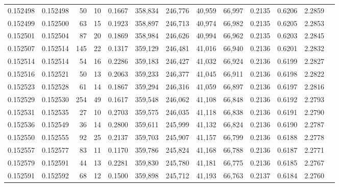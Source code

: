 \begin{tabular}{rrrrrrrrrrrrr}
0.152498 & 0.152498 &    50 &  10 &                                     0.1667 & 358,834 & 246,776 &  40,959 &  66,997 & 0.2135 & 0.6206 & 2.2859 \\
0.152499 & 0.152500 &    63 &  15 &                                     0.1923 & 358,897 & 246,713 &  40,974 &  66,982 & 0.2135 & 0.6205 & 2.2853 \\
0.152501 & 0.152504 &    87 &  20 &                                     0.1869 & 358,984 & 246,626 &  40,994 &  66,962 & 0.2135 & 0.6203 & 2.2845 \\
0.152507 & 0.152514 &   145 &  22 &                                     0.1317 & 359,129 & 246,481 &  41,016 &  66,940 & 0.2136 & 0.6201 & 2.2832 \\
0.152514 & 0.152514 &    54 &  16 &                                     0.2286 & 359,183 & 246,427 &  41,032 &  66,924 & 0.2136 & 0.6199 & 2.2827 \\
0.152516 & 0.152521 &    50 &  13 &                                     0.2063 & 359,233 & 246,377 &  41,045 &  66,911 & 0.2136 & 0.6198 & 2.2822 \\
0.152523 & 0.152528 &    61 &  14 &                                     0.1867 & 359,294 & 246,316 &  41,059 &  66,897 & 0.2136 & 0.6197 & 2.2816 \\
0.152529 & 0.152530 &   254 &  49 &                                     0.1617 & 359,548 & 246,062 &  41,108 &  66,848 & 0.2136 & 0.6192 & 2.2793 \\
0.152531 & 0.152535 &    27 &  10 &                                     0.2703 & 359,575 & 246,035 &  41,118 &  66,838 & 0.2136 & 0.6191 & 2.2790 \\
0.152536 & 0.152549 &    36 &  14 &                                     0.2800 & 359,611 & 245,999 &  41,132 &  66,824 & 0.2136 & 0.6190 & 2.2787 \\
0.152550 & 0.152555 &    92 &  25 &                                     0.2137 & 359,703 & 245,907 &  41,157 &  66,799 & 0.2136 & 0.6188 & 2.2778 \\
0.152557 & 0.152577 &    83 &  11 &                                     0.1170 & 359,786 & 245,824 &  41,168 &  66,788 & 0.2136 & 0.6187 & 2.2771 \\
0.152579 & 0.152591 &    44 &  13 &                                     0.2281 & 359,830 & 245,780 &  41,181 &  66,775 & 0.2136 & 0.6185 & 2.2767 \\
0.152591 & 0.152592 &    68 &  12 &                                     0.1500 & 359,898 & 245,712 &  41,193 &  66,763 & 0.2137 & 0.6184 & 2.2760 \\

\end{tabular}
